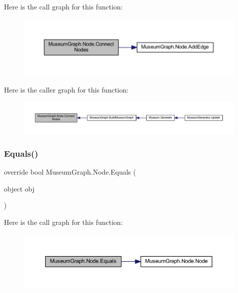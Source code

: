 Here is the call graph for this function\+:
\nopagebreak
\begin{figure}[H]
\begin{center}
\leavevmode
\includegraphics[width=350pt]{class_museum_graph_1_1_node_afc85f1140ee37f6365863f34ac3482bc_cgraph}
\end{center}
\end{figure}
Here is the caller graph for this function\+:
\nopagebreak
\begin{figure}[H]
\begin{center}
\leavevmode
\includegraphics[width=350pt]{class_museum_graph_1_1_node_afc85f1140ee37f6365863f34ac3482bc_icgraph}
\end{center}
\end{figure}
\mbox{\label{class_museum_graph_1_1_node_a341a560512b816a8af059813480ef9da}} 
\subsubsection{\texorpdfstring{Equals()}{Equals()}}
{\footnotesize\ttfamily override bool Museum\+Graph.\+Node.\+Equals (\begin{DoxyParamCaption}\item[{object}]{obj }\end{DoxyParamCaption})}

Here is the call graph for this function\+:
\nopagebreak
\begin{figure}[H]
\begin{center}
\leavevmode
\includegraphics[width=350pt]{class_museum_graph_1_1_node_a341a560512b816a8af059813480ef9da_cgraph}
\end{center}
\end{figure}
\mbox{\label{class_museum_graph_1_1_node_adcc32750b64d61121c1431ffc41b0f8d}} 
